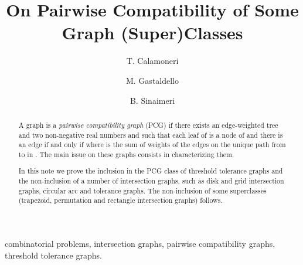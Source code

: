 \documentclass{elsarticle}
\begin{document}
\begin{frontmatter}

\title{On Pairwise Compatibility of Some Graph (Super)Classes}

\author[comp]{T. Calamoneri}

\author[comp,INRIA]{M. Gastaldello}

\author[INRIA]{B. Sinaimeri}

\address[comp]{Department of Computer Science, ``Sapienza'' University of Rome, Italy}
\address[INRIA]{INRIA and Universit\'e de Lyon, Universit\'e Lyon 1, LBBE, CNRS UMR558, France}







\begin{abstract}
A graph  is a {\em pairwise compatibility graph} (PCG) if there exists an edge-weighted tree  and two non-negative real numbers  and  such that each leaf  of  is a node of  and there is an edge  if and only if  where  is the sum of weights of the edges on the unique path from  to  in . 
The main issue on these graphs consists in characterizing them.

In this note we prove the inclusion in the PCG class of threshold tolerance graphs and the non-inclusion of a number of intersection graphs, such as disk and grid intersection graphs, circular arc and tolerance graphs. 
The non-inclusion of some superclasses (trapezoid, permutation and rectangle intersection graphs) follows.
\end{abstract}

\begin{keyword}
combinatorial problems, intersection graphs, pairwise compatibility graphs, threshold tolerance graphs.
\end{keyword}

\end{frontmatter}
\end{document}
